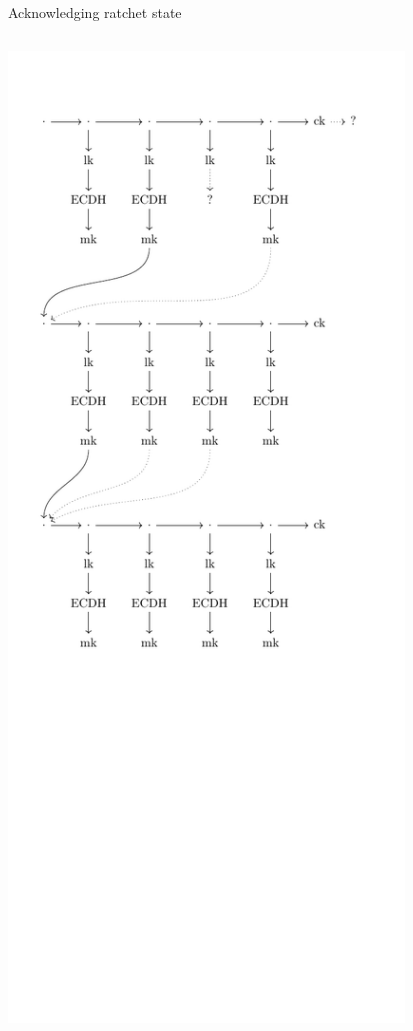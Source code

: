 \documentclass[fleqn,xcolor={usenames,dvipsnames}]{beamer}
\begin{document}
\begin{frame}[t]{Acknowledging ratchet state }
\begin{columns}[T]
\includegraphics[width=0.95\textwidth,trim={0 0 0 47},clip]{Xolotl_diagram0}
\end{columns}
\end{frame}
\end{document}
